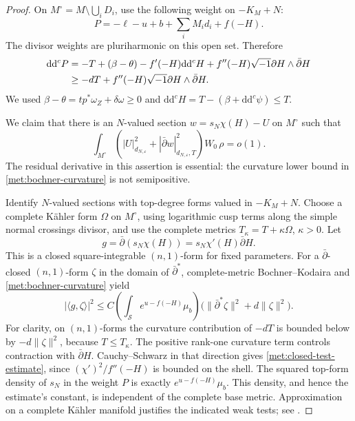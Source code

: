\documentclass[11pt,letterpaper]{article}
\theoremstyle{definition}
\theoremstyle{remark}
\begin{document}
\begin{proof}
On \(M^\circ=M\setminus\bigcup_iD_i\), use the following weight on
\(-K_M+N\):
\begin{equation}
 \label{met:bochner-weight}
 P=-\ell-u+b+\sum_iM_i d_i+f(-H).
\end{equation}
The divisor weights are pluriharmonic on this open set.  Therefore
\begin{align}
 \label{met:bochner-curvature}
 \mathrm{d}\mathrm{d}^{c} P
 &=-T+(\beta-\theta)-f'(-H)\mathrm{d}\mathrm{d}^{c} H
       +f''(-H)\sqrt{-1}\partial H\wedge\bar\partial H\notag\\
 &\geq-dT+f''(-H)\sqrt{-1}\partial H\wedge\bar\partial H.
\end{align}
We used \(\beta-\theta=t p^*\omega_Z+\delta\omega\geq0\) and
\(\mathrm{d}\mathrm{d}^{c} H=T-(\beta+\mathrm{d}\mathrm{d}^{c}\psi)\leq T\).

We claim that there is an \(N\)-valued section
\(w=s_N\chi(H)-U\) on \(M^\circ\) such that
\begin{equation}
 \label{met:bochner-result}
 \int_{M^\circ}
 \left(|U|_{d_{N,\varepsilon}}^2
       +|\bar\partial w|_{d_{N,\varepsilon},T}^2\right)
 W_0\,\rho=o(1).
\end{equation}
The residual derivative in this assertion is essential: the curvature
lower bound in \eqref{met:bochner-curvature} is not semipositive.

Identify \(N\)-valued sections with top-degree forms valued in
\(-K_M+N\).  Choose a complete K\"ahler form \(\Omega\) on
\(M^\circ\), using logarithmic cusp terms along the simple normal
crossings divisor, and use the complete metrics
\(T_\kappa=T+\kappa\Omega\), \(\kappa>0\).  Let
\[
 g=\bar\partial(s_N\chi(H))
   =s_N\chi'(H)\bar\partial H.
\]
This is a closed square-integrable \((n,1)\)-form for fixed parameters.
For a \(\bar\partial\)-closed \((n,1)\)-form \(\zeta\) in the domain
of \(\bar\partial^*\), complete-metric Bochner--Kodaira and
\eqref{met:bochner-curvature} yield
\begin{equation}
 \label{met:closed-test-estimate}
 |\langle g,\zeta\rangle|^2
 \leq C\left(\int_{\mathcal S}e^{u-f(-H)}\mu_b\right)
       \bigl(\|\bar\partial^*\zeta\|^2+d\|\zeta\|^2\bigr).
\end{equation}
For clarity, on \((n,1)\)-forms the curvature contribution of
\(-dT\) is bounded below by \(-d\|\zeta\|^2\), because
\(T\leq T_\kappa\).  The positive rank-one curvature term controls
contraction with \(\bar\partial H\).  Cauchy--Schwarz in that
direction gives \eqref{met:closed-test-estimate}, since
\((\chi')^2/f''(-H)\) is bounded on the shell.  The squared top-form
density of \(s_N\) in the weight \(P\) is exactly
\(e^{u-f(-H)}\mu_b\).  This density, and hence the estimate's
constant, is independent of the complete base metric.  Approximation
on a complete K\"ahler manifold justifies the indicated weak tests;
see \cite[Sections 4--5]{DemaillyL2}.


\end{proof}
\end{document}
